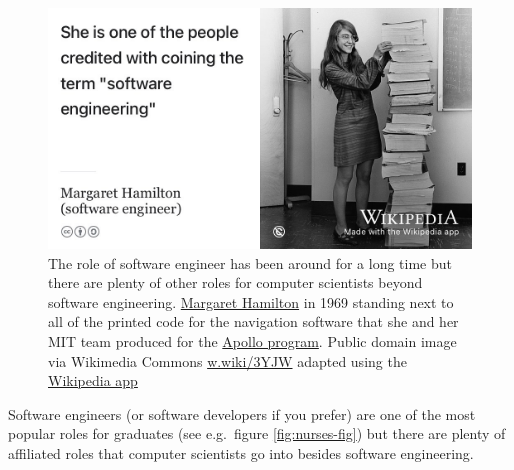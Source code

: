 \documentclass[
]{book}
\begin{document}
\begin{figure}

{\centering \includegraphics[width=1\linewidth]{images/margaret-hamilton} 

}

\caption{The role of software engineer has been around for a long time but there are plenty of other roles for computer scientists beyond software engineering. \href{https://en.wikipedia.org/wiki/Margaret_Hamilton_(software_engineer)}{Margaret Hamilton} in 1969 standing next to all of the printed code for the navigation software that she and her MIT team produced for the \href{https://en.wikipedia.org/wiki/Apollo_program}{Apollo program}. Public domain image via Wikimedia Commons \href{https://w.wiki/3YJW}{w.wiki/3YJW} adapted using the \href{https://apps.apple.com/us/app/wikipedia/id324715238}{Wikipedia app}}\label{fig:hamilton-fig}
\end{figure}



Software engineers (or software developers if you prefer) are one of the most popular roles for graduates (see e.g.~figure \ref{fig:nurses-fig}) but there are plenty of affiliated roles that computer scientists go into besides software engineering.
\end{document}
